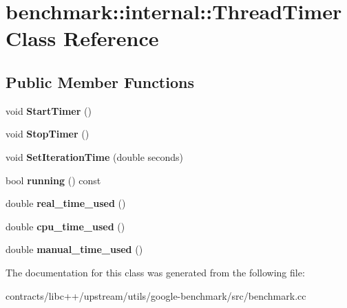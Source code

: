 \hypertarget{classbenchmark_1_1internal_1_1_thread_timer}{}\section{benchmark\+:\+:internal\+:\+:Thread\+Timer Class Reference}
\label{classbenchmark_1_1internal_1_1_thread_timer}
\subsection*{Public Member Functions}
\begin{DoxyCompactItemize}
\item 
\mbox{\label{classbenchmark_1_1internal_1_1_thread_timer_a32ae8d6d63cc1df671f3285007df6f61}} 
void {\bfseries Start\+Timer} ()
\item 
\mbox{\label{classbenchmark_1_1internal_1_1_thread_timer_ab46b1ecb8c46f3383a2ef025518e5b70}} 
void {\bfseries Stop\+Timer} ()
\item 
\mbox{\label{classbenchmark_1_1internal_1_1_thread_timer_af027cc6bafde17088e2c951fb134731f}} 
void {\bfseries Set\+Iteration\+Time} (double seconds)
\item 
\mbox{\label{classbenchmark_1_1internal_1_1_thread_timer_a79fe318465cdd6523993e10da8f13ba2}} 
bool {\bfseries running} () const
\item 
\mbox{\label{classbenchmark_1_1internal_1_1_thread_timer_acb2e24e77b95679fb5ae6cd5be8a5096}} 
double {\bfseries real\+\_\+time\+\_\+used} ()
\item 
\mbox{\label{classbenchmark_1_1internal_1_1_thread_timer_ad254872612c35a9cd97b1a07495e6367}} 
double {\bfseries cpu\+\_\+time\+\_\+used} ()
\item 
\mbox{\label{classbenchmark_1_1internal_1_1_thread_timer_abf92fab76a002f91bf3c3ab93f4525bc}} 
double {\bfseries manual\+\_\+time\+\_\+used} ()
\end{DoxyCompactItemize}


The documentation for this class was generated from the following file\+:\begin{DoxyCompactItemize}
\item 
contracts/libc++/upstream/utils/google-\/benchmark/src/benchmark.\+cc\end{DoxyCompactItemize}
